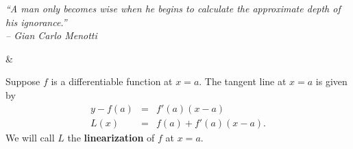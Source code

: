 \documentclass{book}
\begin{document}
\begin{center} 
\emph{``A man only becomes wise when he begins to calculate the approximate depth of his ignorance.''\\ -- Gian Carlo Menotti}
\end{center}

\begin{Videos}
 &
\end{Videos}
%

Suppose $f$ is a differentiable function at $x=a$. %
The tangent line at $x=a$ is given by 
\begin{eqnarray}
\nonumber y-f(a) &=& f'(a)(x-a)\\
L(x) &=& f(a) +f'(a)(x-a).
\end{eqnarray} We will call $L$ the \textbf{linearization} of $f$ at $x=a$.\\ %
\end{document}
